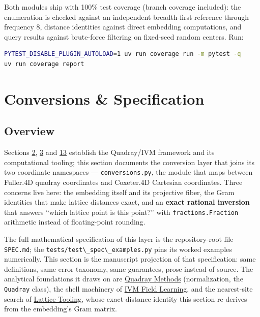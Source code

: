 \documentclass[
  10pt,
]{article}
\newcommand{\passthrough}[1]{#1}
\begin{document}
Both modules ship with 100\% test coverage (branch coverage included):
the enumeration is checked against an independent breadth-first
reference through frequency 8, distance identities against direct
embedding computations, and query results against brute-force filtering
on fixed-seed random centers. Run:

\begin{lstlisting}[language=bash]
PYTEST_DISABLE_PLUGIN_AUTOLOAD=1 uv run coverage run -m pytest -q
uv run coverage report
\end{lstlisting}

\newpage

\section{Conversions \& Specification}\label{conversions-specification}

\subsection{Overview}\label{overview-7}

Sections \href{02_4d_namespaces.md}{2}, \href{03_quadray_methods.md}{3}
and \href{13_lattice_tooling.md}{13} establish the Quadray/IVM framework
and its computational tooling; this section documents the conversion
layer that joins its two coordinate namespaces ---
\passthrough{\lstinline!conversions.py!}, the module that maps between
Fuller.4D quadray coordinates and Coxeter.4D Cartesian coordinates.
Three concerns live here: the embedding itself and its projective fiber,
the Gram identities that make lattice distances exact, and an
\textbf{exact rational inversion} that answers ``which lattice point is
this point?'' with \passthrough{\lstinline!fractions.Fraction!}
arithmetic instead of floating-point rounding.

The full mathematical specification of this layer is the repository-root
file \passthrough{\lstinline!SPEC.md!}; the
\passthrough{\lstinline!tests/test\_spec\_examples.py!} pins its worked
examples numerically. This section is the manuscript projection of that
specification: same definitions, same error taxonomy, same guarantees,
prose instead of source. The analytical foundations it draws on are
\href{03_quadray_methods.md}{Quadray Methods} (normalization, the
\passthrough{\lstinline!Quadray!} class), the shell machinery of
\href{11_ivm_field_learning.md}{IVM Field Learning}, and the
nearest-site search of \href{13_lattice_tooling.md}{Lattice Tooling},
whose exact-distance identity this section re-derives from the
embedding's Gram matrix.
\end{document}
